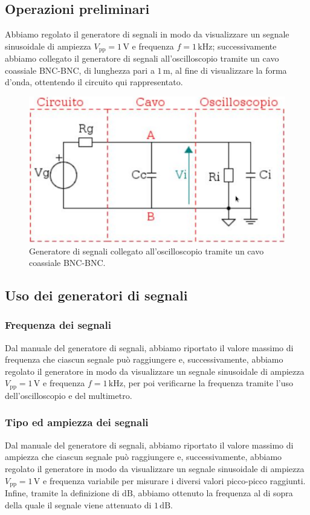 \documentclass[a4paper]{article}
\begin{document}
		\subsection{Operazioni preliminari}
			Abbiamo regolato il generatore di segnali in modo da visualizzare un segnale sinusoidale di ampiezza $ V_{\mathrm{pp}} = 1 \, \mathrm{V} $ e frequenza $ f = 1 \, \mathrm{kHz} $; successivamente abbiamo collegato il generatore di segnali all'oscilloscopio tramite un cavo coassiale BNC-BNC, di lunghezza pari a $ 1 \, \mathrm{m} $, al fine di visualizzare la forma d'onda, ottentendo il circuito qui rappresentato.
			\begin{figure}[h!]
				\centering
				\includegraphics[scale=0.4]{theveninCavoDSO}
				\caption{Generatore di segnali collegato all'oscilloscopio tramite un cavo coassiale BNC-BNC.}
				\label{fig:theveninCavoDSO}
			\end{figure}
		\subsection{Uso dei generatori di segnali}
			\subsubsection{Frequenza dei segnali}
				Dal manuale del generatore di segnali, abbiamo riportato il valore massimo di frequenza che ciascun segnale può raggiungere e, successivamente, abbiamo regolato il generatore in modo da visualizzare un segnale sinusoidale di ampiezza $ V_{\mathrm{pp}} = 1 \, \mathrm{V} $ e frequenza $ f = 1 \, \mathrm{kHz} $, per poi verificarne la frequenza tramite l'uso dell'oscilloscopio e del multimetro.
			\subsubsection{Tipo ed ampiezza dei segnali}
				Dal manuale del generatore di segnali, abbiamo riportato il valore massimo di ampiezza che ciascun segnale può raggiungere e, successivamente, abbiamo regolato il generatore in modo da visualizzare un segnale sinusoidale di ampiezza $ V_{\mathrm{pp}} = 1 \, \mathrm{V} $ e frequenza variabile per misurare i diversi valori picco-picco raggiunti.
				\newline
				Infine, tramite la definizione di $ \mathrm{dB} $, abbiamo ottenuto la frequenza al di sopra della quale il segnale viene attenuato di $ 1 \, \mathrm{dB} $.
\end{document}
